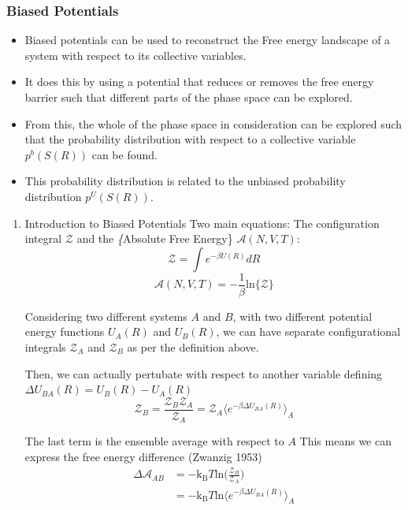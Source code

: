 \documentclass[11pt]{article}
\begin{document}
\begin{enumerate}
\subsubsection{Biased Potentials}
\label{sec:org2a90d74}
\begin{itemize}
\item Biased potentials can be used to reconstruct the Free energy landscape
of a system with respect to its collective variables.
\item It does this by using a potential that reduces or removes the free
energy barrier such that different parts of the phase space can be
explored.
\item From this, the whole of the phase space in consideration can be explored
such that the probability distribution with respect to a collective
variable \(p^{b}(S(R))\) can be found.
\item This probability distribution is related to the unbiased probability
distribution \(p^{U}(S(R))\).
\end{itemize}

\begin{enumerate}
\item Introduction to Biased Potentials
\label{sec:org0c66ff2}
Two main equations:
The configuration integral \(\mathcal{Z}\) and the \emph\{Absolute Free
  Energy\} \(\mathcal{A}(N,V,T)\):
\[ \mathcal{Z} = \int e^{-\beta U(R)} dR\]
\[ \mathcal{A}(N,V,T) = -\frac{1}{\beta} \text{ln}\big\{ \mathcal{Z}
     \big\} \]

Considering two different systems \(A\) and \(B\), with two different
potential energy functions \(U_A(R)\) and \(U_B(R)\), we can have separate
configurational integrals \(\mathcal{Z}_{A}\) and \(\mathcal{Z}_{B}\) as per
the definition above. 

Then, we can actually pertubate with respect to
another variable defining \(\Delta U_{BA}(R) = U_{B}(R) - U_{A}(R)\)
\[ \mathcal{Z}_{B} =  \frac{\mathcal{Z}_{B}\mathcal{Z}_{A}}{\mathcal{Z}_{A}} = \mathcal{Z}_{A}
     \big\langle e^{-\beta \Delta U_{BA}(R)}\big\rangle_{A} \]

The last term is the ensemble average with respect to \(A\)
This means we can express the free energy difference (Zwanzig 1953)
\begin{align}
\Delta \mathcal{A}_{AB} &=  -\text{k}_{\text{B}} T \text{ln} \Big(
\frac{\mathcal{Z}_{B}}{\mathcal{Z}_{A}}\Big)\\ &=  -\text{k}_{\text{B}} T
\text{ln} \big\langle e^{-\beta \Delta U_{BA}(R)}\big\rangle_{A} 
\end{align}


\end{enumerate}
\end{enumerate}
\end{document}

